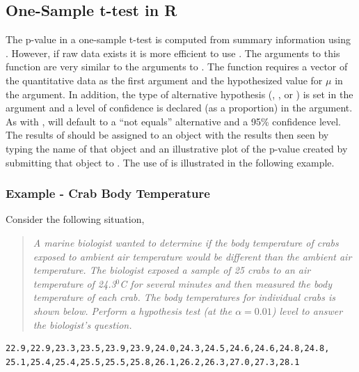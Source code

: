 \documentclass[10pt,openany]{book}\usepackage[]{graphicx}\usepackage[]{color}
\begin{document}
\subsection{One-Sample t-test in R}
The p-value in a one-sample t-test is computed from summary information using .  However, if raw data exists it is more efficient to use .  The arguments to this function are very similar to the arguments to .  The  function requires a vector of the quantitative data as the first argument and the hypothesized value for $\mu$ in the  argument.  In addition, the type of alternative hypothesis (, , or ) is set in the  argument and a level of confidence is declared (as a proportion) in the  argument.  As with ,  will default to a ``not equals'' alternative and a 95\% confidence level.  The results of  should be assigned to an object with the results then seen by typing the name of that object and an illustrative plot of the p-value created by submitting that object to .  The use of  is illustrated in the following example.

\subsubsection{Example - Crab Body Temperature}
Consider the following situation,
\begin{quote}
\textsl{A marine biologist wanted to determine if the body temperature of crabs exposed to ambient air temperature would be different than the ambient air temperature.  The biologist exposed a sample of 25 crabs to an air temperature of 24.3$^{0}$C for several minutes and then measured the body temperature of each crab.  The body temperatures for individual crabs is shown below.  Perform a hypothesis test (at the $\alpha=0.01$) level to answer the biologist's question.}
\end{quote}

\begin{Verbatim}[xleftmargin=5mm]
22.9,22.9,23.3,23.5,23.9,23.9,24.0,24.3,24.5,24.6,24.6,24.8,24.8,
25.1,25.4,25.4,25.5,25.5,25.8,26.1,26.2,26.3,27.0,27.3,28.1
\end{Verbatim}
\end{document}

